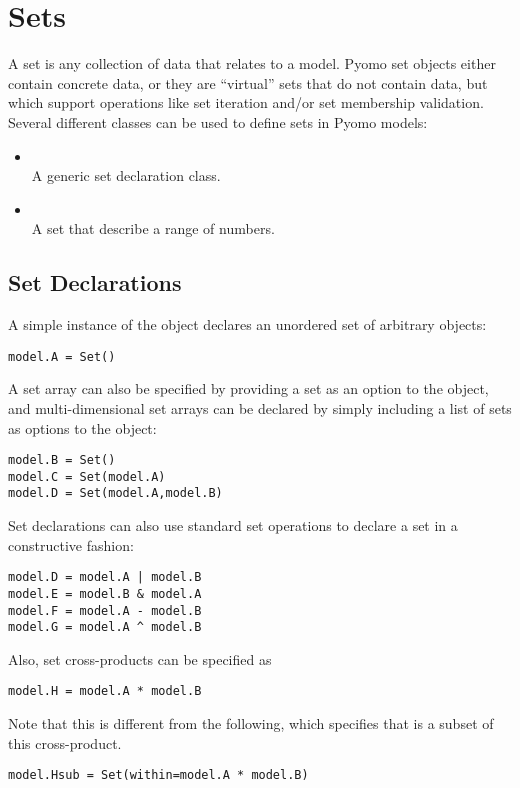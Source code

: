 \section{Sets}

A set is any collection of data that relates to a model.  Pyomo set
objects either contain concrete data, or they are ``virtual'' sets that
do not contain data, but which support operations like set iteration
and/or set membership validation.  Several different classes can be used
to define sets in Pyomo models:
\begin{itemize}

\item {}\\
    A generic set declaration class.

\item {}\\
    A set that describe a range of numbers.
\end{itemize}



\subsection{Set Declarations}

A simple instance of the  object declares an unordered set of arbitrary objects:
\begin{lstlisting}
model.A = Set()
\end{lstlisting}
A set array can also be specified by providing a set as an option
to the  object, and  multi-dimensional set arrays can be declared by simply including a list of sets as options to the  object:
\begin{lstlisting}
model.B = Set()
model.C = Set(model.A)
model.D = Set(model.A,model.B)
\end{lstlisting}
Set declarations can also use standard set operations to declare
a set in a constructive fashion:
\begin{lstlisting}
model.D = model.A | model.B
model.E = model.B & model.A
model.F = model.A - model.B
model.G = model.A ^ model.B
\end{lstlisting}
Also, set cross-products can be specified as 
\begin{lstlisting}
model.H = model.A * model.B
\end{lstlisting}
Note that this is different from the following, which specifies that 
is a subset of this cross-product.
\begin{lstlisting}
model.Hsub = Set(within=model.A * model.B)
\end{lstlisting}


